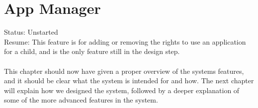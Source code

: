 \section{App Manager}
Status: Unstarted\\
Resume: This feature is for adding or removing the rights to use an application for a child, and is the only feature still in the design step.\\
\\
This chapter should now have given a proper overview of the systems features, and it should be clear what the system is intended for and how. The next chapter will explain how we designed the system, followed by a deeper explanation of some of the more advanced features in the system.